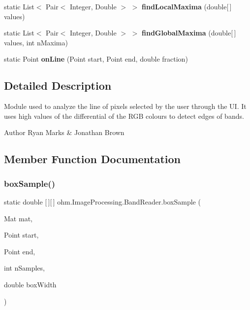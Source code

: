 \begin{DoxyCompactItemize}
static List$<$ Pair$<$ Integer, Double $>$ $>$ {\bfseries find\+Local\+Maxima} (double\mbox{[}$\,$\mbox{]} values)
\item 
\hypertarget{classohm_1_1_image_processing_1_1_band_reader_a47dfacb42d8def145a59303e52073c94}{}\label{classohm_1_1_image_processing_1_1_band_reader_a47dfacb42d8def145a59303e52073c94} 
static List$<$ Pair$<$ Integer, Double $>$ $>$ {\bfseries find\+Global\+Maxima} (double\mbox{[}$\,$\mbox{]} values, int n\+Maxima)
\item 
\hypertarget{classohm_1_1_image_processing_1_1_band_reader_a9a9a7aec0df75f13f97fad3a4f985eca}{}\label{classohm_1_1_image_processing_1_1_band_reader_a9a9a7aec0df75f13f97fad3a4f985eca} 
static Point {\bfseries on\+Line} (Point start, Point end, double fraction)
\end{DoxyCompactItemize}


\subsection{Detailed Description}
Module used to analyze the line of pixels selected by the user through the UI. It uses high values of the differential of the R\+GB colours to detect edges of bands. 

\begin{DoxyAuthor}{Author}
Ryan Marks \& Jonathan Brown 
\end{DoxyAuthor}


\subsection{Member Function Documentation}
\hypertarget{classohm_1_1_image_processing_1_1_band_reader_a2e83767f5674f1463cb0168df8d073fa}{}\label{classohm_1_1_image_processing_1_1_band_reader_a2e83767f5674f1463cb0168df8d073fa} 
\subsubsection{\texorpdfstring{box\+Sample()}{boxSample()}}
{\footnotesize\ttfamily static double \mbox{[}$\,$\mbox{]}\mbox{[}$\,$\mbox{]} ohm.\+Image\+Processing.\+Band\+Reader.\+box\+Sample (\begin{DoxyParamCaption}\item[{Mat}]{mat,  }\item[{Point}]{start,  }\item[{Point}]{end,  }\item[{int}]{n\+Samples,  }\item[{double}]{box\+Width }\end{DoxyParamCaption})\hspace{0.3cm}{\ttfamily [static]}}

